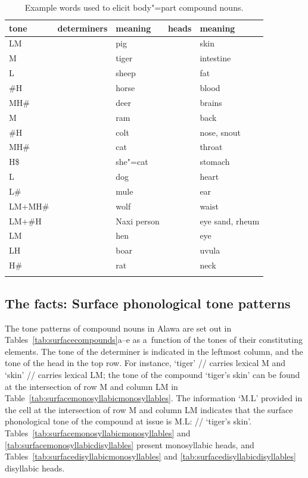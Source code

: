 \begin{table}[t]
\caption{Example words used to elicit body"=part compound nouns.}
\begin{tabularx}{\textwidth}{ l Q Q Q l }
\lsptoprule
	tone & determiners & meaning & heads & meaning\\\midrule
	LM &  & pig &  & skin\\
	M &  & tiger &  & intestine\\
	L &  & sheep &  & fat\\
	\#H &  & horse &  & blood\\
	MH\# &  & deer &  & brains\\ \addlinespace \hdashline \addlinespace
	M &  & ram &  & back\\
	\#H &  & colt &  & nose, snout\\
	MH\# &  & cat &  & throat\\
	H\$ &  & she"=cat &  & stomach\\
	L &  & dog &  & heart\\
	L\# &  & mule &  & ear\\
	LM+MH\# &  & wolf &  & waist\\
	LM+\#H &  & Naxi person &  & eye sand, rheum\\
	LM &  & hen &  & eye\\
	LH &  & boar &  & uvula\\
	H\# &  & rat &  & neck\\
\lspbottomrule
\end{tabularx}
\label{tab:examplewordsusedtoelicitbodypartcompoundnouns}
\end{table}

\subsection[Surface phonological tone patterns]{The facts: Surface phonological tone patterns}
\label{sec:thefacts}
\largerpage[-1]

The tone patterns of compound nouns in Alawa are set out in Tables~\ref{tab:surfacecompounds}a--e as a~function of the tones
of their constituting elements. The tone of the determiner is indicated in the leftmost column, and the tone of the head in the top row. For instance, ‘tiger’ // carries lexical M and ‘skin’ // carries lexical LM; the tone of the compound ‘tiger’s skin’ can be found at the intersection of row M and column LM in Table~\ref{tab:surfacemonosyllabicmonosyllables}. The information ‘M.L’ provided in the cell at the intersection of row M and column LM indicates
that the surface phonological tone of the compound at issue is M.L: // ‘tiger’s skin’. Tables~\ref{tab:surfacemonosyllabicmonosyllables} and
\ref{tab:surfacemonosyllabicdisyllables} present monosyllabic heads,
and Tables~\ref{tab:surfacedisyllabicmonosyllables} and \ref{tab:surfacedisyllabicdisyllables} disyllabic
heads. 

